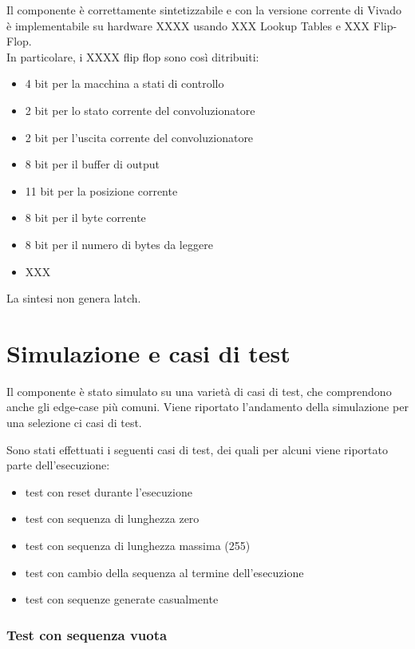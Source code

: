 \documentclass[12pt, a4paper]{article}
\begin{document}
Il componente è correttamente sintetizzabile e con la versione corrente di Vivado è implementabile su hardware 
XXXX usando XXX Lookup Tables e XXX Flip-Flop.
\\
\noindent In particolare, i XXXX flip flop sono così ditribuiti:
\begin{itemize}[itemsep=4pt, topsep=4pt]
    \item 4 bit per la macchina a stati di controllo
    \item 2 bit per lo stato corrente del convoluzionatore
    \item 2 bit per l'uscita corrente del convoluzionatore
    \item 8 bit per il buffer di output
    \item 11 bit per la posizione corrente
    \item 8 bit per il byte corrente
    \item 8 bit per il numero di bytes da leggere
    \item XXX \\
\end{itemize}

\noindent La sintesi non genera latch.


\section{Simulazione e casi di test}

Il componente è stato simulato su una varietà di casi di test, che comprendono anche
gli edge-case più comuni.
Viene riportato l'andamento della simulazione per una selezione ci casi di test.

Sono stati effettuati i seguenti casi di test, dei quali per alcuni viene riportato parte dell'esecuzione: %

\begin{itemize}[itemsep=4pt, topsep=4pt]
    \item test con reset durante l'esecuzione
    \item test con sequenza di lunghezza zero
    \item test con sequenza di lunghezza massima (255)
    \item test con cambio della sequenza al termine dell'esecuzione
    \item test con sequenze generate casualmente
\end{itemize}

\subsubsection{Test con sequenza vuota}
\end{document}
